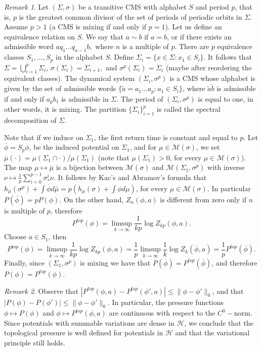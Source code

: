 \documentclass[letterpaper,11pt]{amsart}
\theoremstyle{plain}
\theoremstyle{plain}
\theoremstyle{definition}
\theoremstyle{remark}
\newtheorem{remark}{Remark}[section]
\def\M{{\mathcal M}}
\def\H{{\mathcal H}}
\begin{document}
\begin{remark}\label{mixtotra}Let $(\Sigma, \sigma)$ be a transitive CMS with alphabet $S$ and period $p$, that is, $p$ is the greatest common divisor of the set of periods of periodic orbits in $\Sigma$. Assume $p>1$ (a CMS is mixing if and only if $p=1$). Let us define an equivalence relation on $S$. We say that $a\sim b$ if $a=b$, or if there exists an admissible word  $aq_1\ldots q_{n-1} b,$ where $n$ is a multiple of $p$.  There are $p$ equivalence classes $S_1,\ldots, S_p$ in the alphabet $S$. Define $\Sigma_i=\{x\in\Sigma: x_1\in S_i\}$. It follows that $\Sigma=\bigcup_{i=1}^p \Sigma_i$, $\sigma(\Sigma_i)=\Sigma_{i+1},$ and $\sigma^p(\Sigma_i)=\Sigma_i$ (maybe after reordering the equivalent classes). The dynamical system $(\Sigma_i,\sigma^p)$ is a CMS whose alphabet is given by the set of admissible words $\{\tilde{a}=a_1\ldots a_{p}: a_1\in S_i\}$, where $\tilde{a}\tilde{b}$ is admissible if and only if $a_{p}b_1$ is admissible in $\Sigma$.  The period of  $(\Sigma_i,\sigma^p)$ is equal to one, in other words, it is mixing. The partition $\{\Sigma_i\}_{i=1}^p$ is called the spectral decomposition of $\Sigma$.

Note that if we induce on $\Sigma_1$, the first return time is constant and equal to $p$. Let $\overline{\phi}=S_p\phi$, be the  induced potential on $\Sigma_1$, and for   $\mu\in \M(\sigma)$, we set $\bar{\mu}(\cdot)=\mu(\Sigma_1\cap \cdot)/\mu(\Sigma_1)$ (note that $\mu(\Sigma_1)> 0$, for every $\mu\in\M(\sigma)$). The map $\mu\mapsto\bar{\mu}$ is a bijection between $\M(\sigma)$ and $\M(\Sigma_1,\sigma^p)$ with  inverse  $\nu\mapsto \frac{1}{p}\sum_{i=0}^{p-1}\sigma_*^i\nu$. It follows by Kac's and Abramov's formula that $h_{\bar{\mu}}(\sigma^p)+\int \overline{\phi}d\bar{\mu}=p(h_\mu(\sigma)+\int \phi d\mu)$, for every $\mu\in \M(\sigma)$. In particular $P(\overline{\phi})=pP(\phi)$. On the other hand, $Z_n(\phi,a)$ is different from zero only if $n$ is multiple of $p$, therefore 
$$P^{top}(\phi)=\limsup_{k\to\infty}\frac{1}{kp}\log Z_{kp}(\phi,a).$$
Choose $a\in S_1$, then
$$P^{top}(\phi)=\limsup_{k\to\infty}\frac{1}{kp}\log Z_{kp}(\phi,a)=\frac{1}{p}\limsup_{k\to\infty}\frac{1}{k}\log Z_{k}(\overline{\phi},a)=\frac{1}{p}P^{top}(\overline{\phi}).$$
Finally, since $(\Sigma_1,\sigma^p)$ is mixing we have that $P(\overline{\phi})=P^{top}(\overline{\phi})$, and therefore $P(\phi)=P^{top}(\phi)$.
\end{remark}

\begin{remark}
Observe  that $|P^{top}(\phi,a)-P^{top}(\phi',a)|\le \|\phi-\phi'\|_0$, and that $|P(\phi)-P(\phi')|\le \|\phi-\phi'\|_0$. In particular, the pressure functions $\phi\mapsto P(\phi)$ and $\phi\mapsto P^{top}(\phi,a)$ are continuous with respect to the $C^0-$norm. Since potentials with summable variations are dense in $\H$, we conclude that the topological pressure is well defined for potentials in $\H$ and that the variational principle still holds. 
\end{remark}
\end{document}
